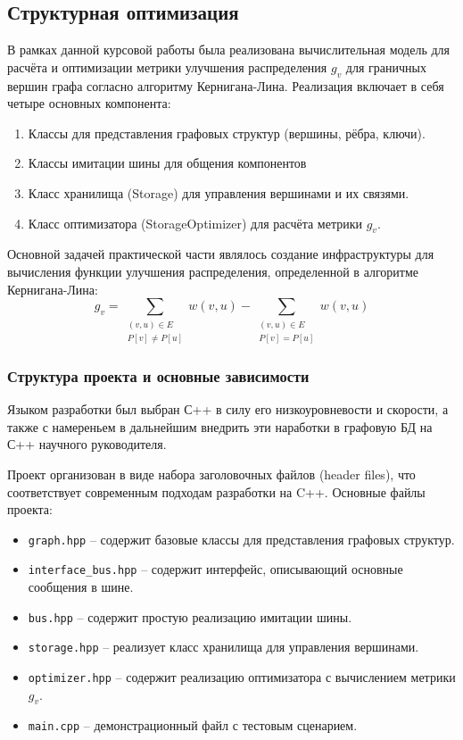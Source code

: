 \subsection{Структурная оптимизация}

В рамках данной курсовой работы была реализована вычислительная модель для расчёта и оптимизации метрики улучшения распределения $g_v$ для граничных вершин графа согласно алгоритму Кернигана-Лина. Реализация включает в себя четыре основных компонента:
\begin{enumerate}
    \item Классы для представления графовых структур (вершины, рёбра, ключи).
    \item Классы имитации шины для общения компонентов
    \item Класс хранилища (Storage) для управления вершинами и их связями.
    \item Класс оптимизатора (StorageOptimizer) для расчёта метрики $g_v$.
\end{enumerate}

Основной задачей практической части являлось создание инфраструктуры для вычисления функции улучшения распределения, определенной в алгоритме Кернигана-Лина:
$$
g_v = \sum_{\substack{(v,u) \in E \\ P[v] \neq P[u]}} w(v,u) - \sum_{\substack{(v,u) \in E \\ P[v] = P[u]}} w(v,u)
$$

\subsubsection{Структура проекта и основные зависимости}

Языком разработки был выбран С++ в силу его низкоуровневости и скорости, а также с намереньем в дальнейшим внедрить эти наработки в графовую БД на С++ научного руководителя.

Проект организован в виде набора заголовочных файлов (header files), что соответствует современным подходам разработки на C++. Основные файлы проекта:

\begin{itemize}
    \item \texttt{graph.hpp} -- содержит базовые классы для представления графовых структур.
    \item \texttt{interface\_bus.hpp} -- содержит интерфейс, описывающий основные сообщения в шине.
    \item \texttt{bus.hpp} -- содержит простую реализацию имитации шины.
    \item \texttt{storage.hpp} -- реализует класс хранилища для управления вершинами.
    \item \texttt{optimizer.hpp} -- содержит реализацию оптимизатора с вычислением метрики $g_v$.
    \item \texttt{main.cpp} -- демонстрационный файл с тестовым сценарием.
\end{itemize}

